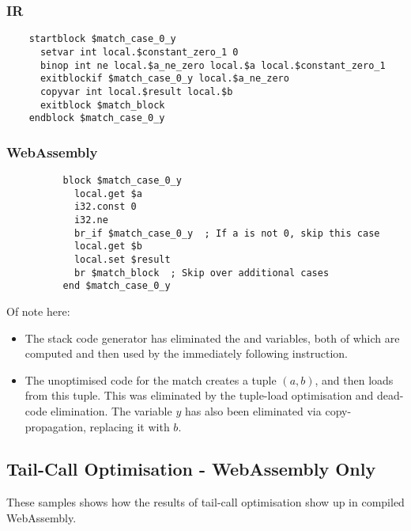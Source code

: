 \subsubsection*{IR}
\begin{verbatim}
    startblock $match_case_0_y
      setvar int local.$constant_zero_1 0
      binop int ne local.$a_ne_zero local.$a local.$constant_zero_1
      exitblockif $match_case_0_y local.$a_ne_zero
      copyvar int local.$result local.$b
      exitblock $match_block
    endblock $match_case_0_y
\end{verbatim}

\subsubsection*{WebAssembly}
\begin{verbatim}
          block $match_case_0_y
            local.get $a
            i32.const 0
            i32.ne
            br_if $match_case_0_y  ; If a is not 0, skip this case
            local.get $b
            local.set $result
            br $match_block  ; Skip over additional cases
          end $match_case_0_y
\end{verbatim}
Of note here:
\begin{itemize}
\item The stack code generator has eliminated the  and  variables, both of which are computed and then used by the immediately following instruction.
\item The unoptimised code for the match creates a tuple $(a, b)$, and then loads from this tuple. This was eliminated by the tuple-load optimisation and dead-code elimination. The variable $y$ has also been eliminated via copy-propagation, replacing it with $b$.
\end{itemize}

\subsection{Tail-Call Optimisation - WebAssembly Only}
These samples shows how the results of tail-call optimisation show up in compiled WebAssembly.

